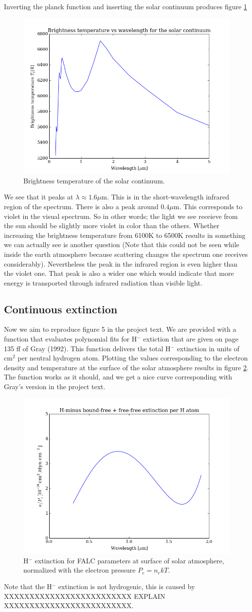 \documentclass{aa}   %
\begin{document}
Inverting the planck function and inserting the solar continuum produces figure \ref{planck_invert}
\begin{figure}
 \includegraphics[width=.49\textwidth]{planck_invert.png}
 \caption{Brightness temperature of the solar continuum.}
 \label{planck_invert} 
\end{figure}
We see that it peaks at $\lambda \approx 1.6 \mu$m.
This is in the short-wavelength infrared region of the spectrum. There is also a peak around $0.4 \mu$m. This corresponds to violet in the visual spectrum. So in other words; the light we see receieve from the sun should be slightly more violet in color than the others. Whether increasing the brightness temperature from 6100K to 6500K results in something we can actually see is another question (Note that this could not be seen while inside the earth atmosphere because scattering changes the spectrum one receives considerably). Nevertheless the peak in the infrared region is even higher than the violet one. That peak is also a wider one which would indicate that more energy is transported through infrared radiation than visible light.
\subsection{Continuous extinction}
Now we aim to reproduce figure 5 in the project text. We are provided with a function that evaluates polynomial fits for H$^-$ extiction that are given on page 135 ff of Gray (1992). This function delivers the total H$^-$ extinction in units of cm$^2$ per neutral hydrogen atom. Plotting the values corresponding to the electron density and temperature at the surface of the solar atmosphere results in figure \ref{extinction}. The function works as it should, and we get a nice curve corresponding with Gray's version in the project text.
\begin{figure}
 \includegraphics[width=.49\textwidth]{extinction.png}
 \caption{H$^-$ extinction for FALC parameters at surface of solar atmosphere, normalized with the electron pressure $P_e =n_e kT$.}
 \label{extinction} 
\end{figure}
Note that the H$^-$ extinction is not hydrogenic, this is caused by XXXXXXXXXXXXXXXXXXXXXXXXX EXPLAIN XXXXXXXXXXXXXXXXXXXXXXXXX.
\end{document}
